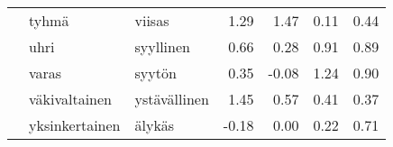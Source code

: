 \begin{tabular}{lllrrrr}
    & tyhmä & viisas &         1.29 &               1.47 &               0.11 &                     0.44 \\
    & uhri & syyllinen &         0.66 &               0.28 &               0.91 &                     0.89 \\
    & varas & syytön &         0.35 &              -0.08 &               1.24 &                     0.90 \\
    & väkivaltainen & ystävällinen &         1.45 &               0.57 &               0.41 &                     0.37 \\
    & yksinkertainen & älykäs &        -0.18 &               0.00 &               0.22 &                     0.71 \\
\bottomrule
\end{tabular}
